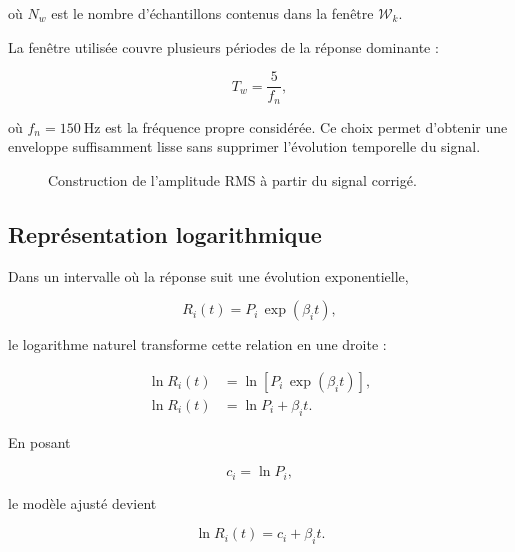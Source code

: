 \documentclass[
    11pt,
    a4paper
]{article}
\begin{document}
où \(N_w\) est le nombre d'échantillons contenus dans la fenêtre
\(\mathcal{W}_k\).

La fenêtre utilisée couvre plusieurs périodes de la réponse dominante :

\begin{equation}
    T_w
    =
    \frac{5}{f_n},
    \label{eq:fenetre-rms}
\end{equation}

où \(f_n=\SI{150}{\hertz}\) est la fréquence propre considérée. Ce choix permet
d'obtenir une enveloppe suffisamment lisse sans supprimer l'évolution
temporelle du signal.

\begin{figure}[H]
    \centering
    \caption{Construction de l'amplitude RMS à partir du signal corrigé.}
    \label{fig:rms-construction}
\end{figure}

\subsection{Représentation logarithmique}
\label{subsec:representation-log}

Dans un intervalle où la réponse suit une évolution exponentielle,

\begin{equation}
    R_i(t)
    =
    P_i\,\exp\left(\beta_i t\right),
    \label{eq:rms-exponentiel}
\end{equation}

le logarithme naturel transforme cette relation en une droite :

\begin{align}
    \ln R_i(t)
    &=
    \ln\left[
        P_i\,\exp\left(\beta_i t\right)
    \right],\\
    \ln R_i(t)
    &=
    \ln P_i+\beta_i t.
    \label{eq:passage-log}
\end{align}

En posant

\begin{equation}
    c_i=\ln P_i,
    \label{eq:def-c}
\end{equation}

le modèle ajusté devient

\begin{equation}
    \ln R_i(t)
    =
    c_i+\beta_i t.
    \label{eq:modele-log}
\end{equation}
\end{document}
